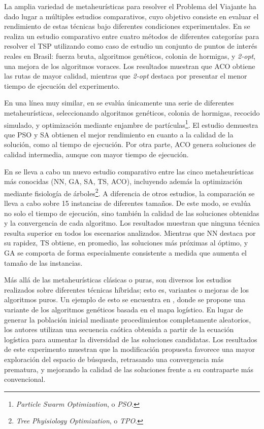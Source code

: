 La amplia variedad de metaheurísticas para resolver el Problema del Viajante ha dado lugar a múltiples estudios comparativos, 
cuyo objetivo consiste en evaluar el rendimiento de estas técnicas bajo diferentes condiciones experimentales.
En \cite{dacosta2021} se realiza un estudio comparativo entre cuatro métodos de diferentes 
categorías para resolver el TSP utilizando como caso de estudio un conjunto de puntos de interés reales en Brasil: 
fuerza bruta, algoritmos genéticos, colonia de hormigas, y \textit{2-opt}, una mejora de los algoritmos voraces.
Los resultados muestran que ACO obtiene las rutas de mayor calidad, mientras que \textit{2-opt} destaca por presentar 
el menor tiempo de ejecución del experimento. 

En una línea muy similar, en \cite{tobi2025} se evalúa únicamente una serie de 
diferentes metaheurísticas, seleccionando algoritmos genéticos, colonia de hormigas, recocido simulado, y optimización 
mediante enjambre de partículas\footnote{\textit{Particle Swarm Optimization}, o \textit{PSO}.}. El estudio demuestra
 que PSO y SA obtienen el mejor rendimiento en cuanto a la calidad de la solución, como al tiempo de 
ejecución. Por otra parte, ACO genera soluciones de calidad intermedia, aunque con mayor tiempo de ejecución.

En \cite{halim2019} se lleva a cabo un nuevo estudio comparativo entre las cinco metaheurísticas más conocidas (NN, GA, 
SA, TS, ACO), incluyendo además la optimización mediante fisiología de árboles\footnote{\textit{Tree Phyisiology 
Optimization}, o \textit{TPO}.}. A diferencia de otros estudios, la comparación se lleva a cabo sobre 15 instancias de 
diferentes tamaños. De este modo, se evalúa no solo el tiempo de ejecución, sino también la calidad de las soluciones
obtenidas y la convergencia de cada algoritmo. Los resultados muestran que ninguna técnica resulta superior en todos 
los escenarios analizados. Mientras que NN destaca por su rapidez, TS obtiene, en promedio, las soluciones más próximas 
al óptimo, y GA se comporta de forma especialmente consistente a medida que aumenta el tamaño de las instancias.

Más allá de las  metaheurísticas clásicas o puras, son diversos los estudios realizados sobre diferentes técnicas 
híbridas; esto es, variantes o mejoras de los algoritmos puros. Un ejemplo de esto se encuentra en \cite{jingyan2012}, donde
se propone una variante de los algoritmos genéticos basada en el mapa logístico. En lugar de generar la población inicial 
mediante procedimientos completamente aleatorios, los autores utilizan una secuencia caótica obtenida a partir de la
ecuación logística \cite{logistic} para aumentar la diversidad de las soluciones candidatas. Los resultados de este experimento
muestran
que la modificación propuesta favorece una mayor exploración del espacio de búsqueda, retrasando una convergencia más 
prematura, y mejorando la calidad de las soluciones frente a su contraparte más convencional.

